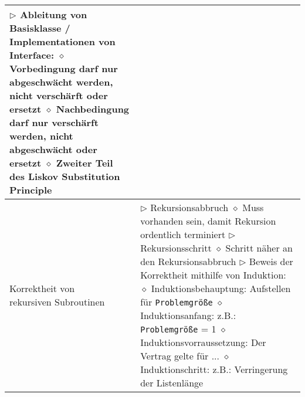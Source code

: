 \begin{longtable}{ | p{} p{} | }
{	$\triangleright$ Ableitung von Basisklasse / Implementationen von Interface: \\
	\hspace{0.4cm} $\diamond$ Vorbedingung darf nur abgeschwächt werden, nicht verschärft oder ersetzt \\
	\hspace{0.4cm} $\diamond$ Nachbedingung darf nur verschärft werden, nicht abgeschwächt oder ersetzt \\
	\hspace{0.4cm} $\diamond$ Zweiter Teil des Liskov Substitution Principle} \\ \hline
	
	\makecell[l]{Korrektheit von \\ rekursiven Subroutinen} & \makecell[l]{
	$\triangleright$ Rekursionsabbruch \\
	\hspace{0.4cm} $\diamond$ Muss vorhanden sein, damit Rekursion ordentlich terminiert \\
	$\triangleright$ Rekursionsschritt \\
	\hspace{0.4cm} $\diamond$ Schritt näher an den Rekursionsabbruch \\
	$\triangleright$ Beweis der Korrektheit mithilfe von Induktion: \\
	\hspace{0.4cm} $\diamond$ Induktionsbehauptung: Aufstellen für \texttt{Problemgrö\ss e} \\
	\hspace{0.4cm} $\diamond$ Induktionsanfang: z.B.: \texttt{Problemgrö\ss e} = 1 \\
	\hspace{0.4cm} $\diamond$ Induktionsvorraussetzung: Der Vertrag gelte für ... \\
	\hspace{0.4cm} $\diamond$ Induktionschritt: z.B.: Verringerung der Listenlänge } \\ \hline


\end{longtable}
